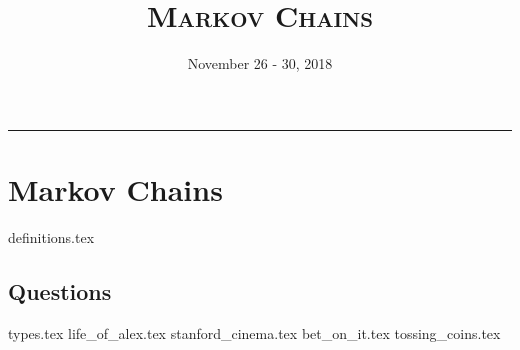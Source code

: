 \documentclass{exam}
\title{\textsc{Markov Chains}}
\date{November 26 - 30, 2018}
\begin{document}
\maketitle
\rule{\textwidth}{0.15em}
\fontsize{12}{15}\selectfont
\thispagestyle{empty}

\begin{comment}
\section{Confidence Intervals}
\subsection{Questions}
\begin{questions}
{intro_prob.tex}
{unknown_die.tex}
\end{questions}
\newpage 
\end{comment}

\section{Markov Chains}
{definitions.tex}
\subsection{Questions}
\begin{questions}
{types.tex}
{life_of_alex.tex}
{stanford_cinema.tex}
{bet_on_it.tex}
{tossing_coins.tex}
\end{questions}
\end{document}
